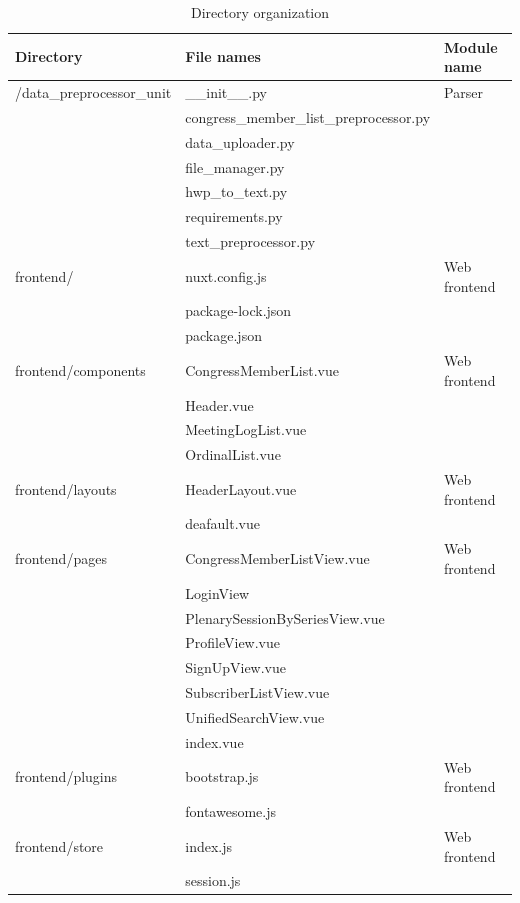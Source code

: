 \documentclass[conference]{IEEEtran}
\begin{document}
  \begin{table}[htbp]
  \renewcommand{\arraystretch}{1.5}
\caption{Directory organization}
\begin{center}
\begin{tabular}{|p{2.5cm}|p{4cm}|p{1.2cm}|}
\hline
\textbf{Directory} & \textbf{File names } &\textbf{Module name} \\
\hline
/data\_preprocessor\_unit& \_\_init\_\_.py&Parser \\
& congress\_member\_list\_preprocessor.py&\\
& data\_uploader.py &\\
& file\_manager.py &\\
& hwp\_to\_text.py & \\
& requirements.py & \\
&text\_preprocessor.py& \\

\hline
frontend/& nuxt.config.js&Web frontend \\
& package-lock.json & \\
& package.json & \\

\hline
frontend/components& CongressMemberList.vue& Web frontend\\
& Header.vue&\\
& MeetingLogList.vue & \\
& OrdinalList.vue & \\

\hline
frontend/layouts& HeaderLayout.vue& Web frontend\\
& deafault.vue &\\

\hline
frontend/pages& CongressMemberListView.vue & Web frontend\\
& LoginView & \\
& PlenarySessionBySeriesView.vue & \\
& ProfileView.vue & \\
& SignUpView.vue & \\
& SubscriberListView.vue & \\
& UnifiedSearchView.vue & \\
& index.vue & \\
\hline
frontend/plugins & bootstrap.js & Web frontend\\
& fontawesome.js & \\
\hline
frontend/store& index.js & Web frontend \\
& session.js & \\
\hline



\end{tabular}
\end{center}
\end{table}
\end{document}
